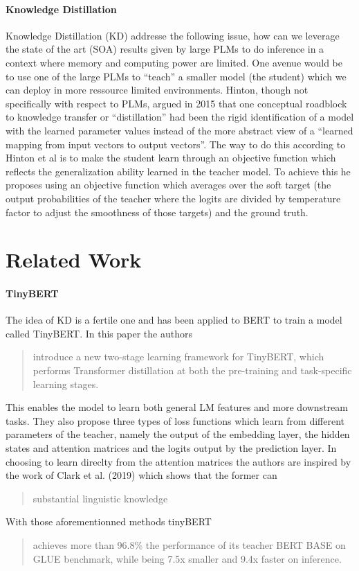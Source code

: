 \documentclass{article}
\begin{document}
\paragraph{Knowledge Distillation} Knowledge Distillation (KD) addresse the
following issue, how can we leverage the state of the art (SOA) results given by
large PLMs to do inference in a context where memory and computing power are
limited. One avenue would be to use one of the large PLMs to ``teach'' a smaller
model (the student) which we can deploy in more ressource limited environments.
Hinton, though not specifically with respect to PLMs, argued in
2015\cite{hinton2015distilling} that one conceptual roadblock to knowledge
transfer or ``distillation'' had been the rigid identification of a model with
the learned parameter values instead of the more abstract view of a
\enquote{learned mapping from input vectors to output
vectors}\cite{hinton2015distilling}. The way to do this according to Hinton et
al is to make the student learn through an objective function which reflects the
generalization ability learned in the teacher model. To achieve this he proposes
using an objective function which averages over the soft target (the output
probabilities of the teacher where the logits are divided by temperature factor
to adjust the smoothness of those targets) and the ground truth.

\section{Related Work}

\paragraph{TinyBERT} The idea of KD is a fertile one and has been
applied to BERT to train a model called TinyBERT\cite{tinybert}. In this paper
the authors \blockcquote{tinybert}{introduce a new two-stage learning framework
for TinyBERT, which performs Transformer distillation at both the pre-training
and task-specific learning stages.} This enables the model to learn both general
LM features and more downstream tasks. They also propose three types of loss
functions which learn from different parameters of the teacher, namely the
output of the embedding layer, the hidden states and attention matrices and the
logits output by the prediction layer. In choosing to learn direclty from the
attention matrices the authors are inspired by the work of Clark et al.
(2019)\cite{whatdoesbertlookat} which shows that the former can
\blockcquote{tinybert}{substantial linguistic knowledge}. With those
aforementionned methods tinyBERT \blockcquote{tinybert}{ achieves more than
96.8\% the performance of its teacher BERT BASE on GLUE benchmark,  while
being 7.5x smaller and 9.4x faster on inference.}
\end{document}
